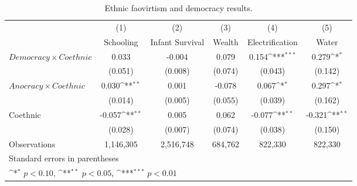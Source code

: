 \begin{table}[htbp]\centering
\def\sym#1{\ifmmode^{#1}\else\(^{#1}\)\fi}
\caption{Ethnic faovirtism and democracy results.}
\begin{adjustbox}{max width=\textwidth}
\begin{threeparttable}[t]
  \centering
\begin{tabular}{l*{5}{c}}
\hline
                    &\multicolumn{1}{c}{(1)}&\multicolumn{1}{c}{(2)}&\multicolumn{1}{c}{(3)}&\multicolumn{1}{c}{(4)}&\multicolumn{1}{c}{(5)}\\
                    &\multicolumn{1}{c}{Schooling}&\multicolumn{1}{c}{Infant Survival}&\multicolumn{1}{c}{Wealth}&\multicolumn{1}{c}{Electrification}&\multicolumn{1}{c}{Water}\\
\midrule
$Democracy \times Coethnic$&       0.033         &      -0.004         &       0.079         &       0.154\sym{***}&       0.279\sym{*}  \\
                    &     (0.051)         &     (0.008)         &     (0.074)         &     (0.043)         &     (0.142)         \\
\addlinespace
$ Anocracy \times Coethnic$&       0.030\sym{**} &       0.001         &      -0.078         &       0.067\sym{*}  &       0.297\sym{*}  \\
                    &     (0.014)         &     (0.005)         &     (0.055)         &     (0.039)         &     (0.162)         \\
\addlinespace
Coethnic            &      -0.057\sym{**} &       0.005         &       0.062         &      -0.077\sym{**} &      -0.321\sym{**} \\
                    &     (0.028)         &     (0.007)         &     (0.074)         &     (0.038)         &     (0.150)         \\
\midrule
Observations        & 1,146,305         & 2,516,748         &  684,762          &  822,330         &  822,330         \\
\hline
\multicolumn{6}{l}{\footnotesize Standard errors in parentheses}\\
\multicolumn{6}{l}{\footnotesize \sym{*} \(p<0.10\), \sym{**} \(p<0.05\), \sym{***} \(p<0.01\)}\\
\end{tabular}
\begin{footnotesize}
 \begin{tablenotes}

\end{tablenotes}
\end{footnotesize}
\end{threeparttable}
\end{adjustbox}
\end{table}
